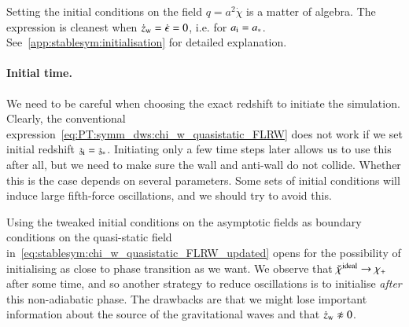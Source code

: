     
    



    Setting the initial conditions on the field $q = a^2 \dot{\chi}$ is a matter of algebra. The expression is cleanest when $\dot{z}_\mathrm{w}=\dot{\epsilon}=0$, i.e. for $a_\mathrm{i}=a_\ast$. See~\cref{app:stablesym:initialisation} for detailed explanation. %




    








    \paragraph{Initial time.} %
    We need to be careful when choosing the exact redshift to initiate the simulation. Clearly, the conventional expression~\cref{eq:PT:symm_dws:chi_w_quasistatic_FLRW} does not work if we set initial redshift $\mathfrak{z}_\mathrm{i}=\mathfrak{z}_\ast$. Initiating only a few time steps later allows us to use this after all, but we need to make sure the wall and anti-wall do not collide. Whether this is the case depends on several parameters. Some sets of initial conditions will induce large fifth-force oscillations, and we should try to avoid this.

    Using the tweaked initial conditions on the asymptotic fields as boundary conditions on the quasi-static field in~\cref{eq:stablesym:chi_w_quasistatic_FLRW_updated} opens for the possibility of initialising as close to phase transition as we want. %
    We observe that $\breve{\chi}^\mathrm{ideal}\to \chi_+ $ after some time, and so another strategy to reduce oscillations is to initialise \emph{after} this non-adiabatic phase. The drawbacks are that we might lose important information about the source of the gravitational waves and that $\dot{z}\ped{w}\not{approx}0$.

